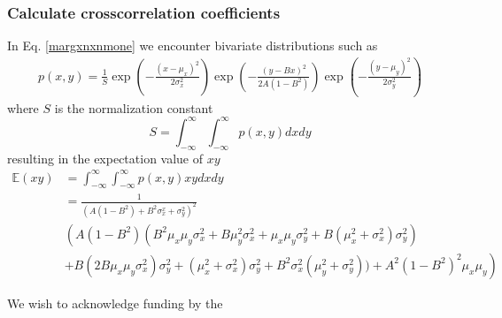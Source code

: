 \documentclass[%
 reprint,
 amsmath,amssymb,
 aps,
]{revtex4-1}
\begin{document}
\subsubsection{Calculate crosscorrelation coefficients}
In Eq. \ref{margxnxnmone} we encounter bivariate distributions such as
\begin{equation}
	\begin{aligned}
	p(x,y)=\frac{1}{S}
	\exp \left( -\frac{{{{\left( {x - \mu_{x}} \right)}^2}}}{{2\sigma_{x}^{2}}} \right)
	\exp \left( -\frac{{{{\left( {y - Bx} \right)}^2}}}{{2A(1-B^{2})}} \right)
	\exp \left( -\frac{{{{\left( {y - \mu_{y}} \right)}^2}}}{{2\sigma_{y}^{2}}} \right)
	\end{aligned}
\end{equation}
where $S$ is the normalization constant
\begin{equation}
	S = \int_{-\infty}^{\infty}\int_{-\infty}^{\infty}p(x,y)dxdy
\end{equation}
resulting in the expectation value of $xy$
\begin{equation}
	\begin{aligned}
	\mathbb{E}(xy) &= \int_{-\infty}^{\infty}\int_{-\infty}^{\infty}p(x,y)xydxdy\\
	&=	\frac{1}{(A(1-B^{2})+B^{2}\sigma^{x}_{x}+\sigma^{2}_{y})^{2}}\\
&\left( A(1-B^{2})(B^{2}\mu_{x}\mu_{y}\sigma_{x}^{2}+B\mu_{y}^{2}\sigma_{x}^{2}+\mu_{x}\mu_{y}\sigma_{y}^{2}+B(\mu_{x}^{2}+\sigma_{x}^{2})\sigma_{y}^{2})\right.\\
	&\left.+B(2B\mu_{x}\mu_{y}\sigma_{x}^{2})\sigma_{y}^{2}+(\mu_{x}^{2}+\sigma_{x}^{2})\sigma_{y}^{2}+B^{2}\sigma_{x}^{2}(\mu_{y}^2+\sigma_{y}^{2}))
	+A^{2}(1-B^{2})^{2}\mu_{x}\mu_{y} \right)
	\end{aligned}
\end{equation}
\begin{acknowledgments}
We wish to acknowledge funding by the 
\end{acknowledgments}

\end{document}
